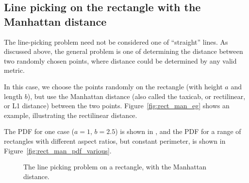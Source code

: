 \subsection{Line picking on the rectangle with the Manhattan distance}
\label{sec:rect_manhattan}

The line-picking problem need not be considered one of ``straight''
lines. As discussed above, the general problem is one of determining
the distance between two randomly chosen points, where distance could
be determined by any valid metric.

In this case, we choose the points randomly on the rectangle (with
height $a$ and length $b$), but use the Manhattan distance (also
called the taxicab, or rectilinear, or L1 distance) between the two
points. Figure~\ref{fig:rect_man_eg} shows an example, illustrating
the rectilinear distance.

The PDF for one case ($a=1$, $b=2.5$) is shown
in \label{fig:rect_man_pdf}, and the PDF for a range of rectangles
with different aspect ratios, but constant perimeter, is shown in
Figure~\ref{fig:rect_man_pdf_various}.

\begin{figure}[tbp]
  \begin{center}
    \hspace{3mm}
    \hspace{3mm}
    \caption{The line picking problem on a rectangle, with the
      Manhattan distance.}
  \end{center} 
\vspace{-4mm}
\end{figure}

